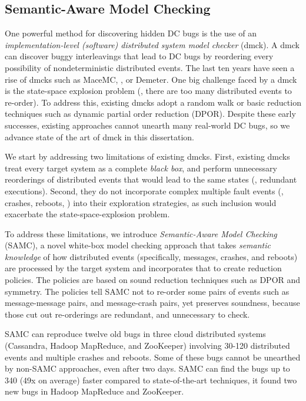 \subsection{Semantic-Aware Model Checking}

One powerful method for discovering hidden DC bugs is the use of an
\textit{implementation-level (software) distributed system model checker} (dmck).  A dmck
can discover buggy interleavings that lead to DC bugs by reordering every
possibility of nondeterministic distributed events. The last ten years have seen
a rise of dmcks such as MaceMC, \modist, or Demeter. One big challenge faced by
a dmck is the state-space explosion problem (\ie, there are too many distributed
events to re-order). To address this, existing dmcks adopt a random walk or
basic reduction techniques such as dynamic partial order reduction (DPOR).
Despite these early successes, existing approaches cannot unearth many
real-world DC bugs, so we advance state of the art of dmck in this dissertation.

We start by addressing two limitations of existing dmcks. First, existing dmcks
treat every target system as a complete \textit{black box}, and perform
unnecessary reorderings of distributed events that would lead to the same states
(\ie, redundant executions). Second, they do not incorporate complex multiple
fault events (\eg, crashes, reboots, \etc) into their exploration strategies, as
such inclusion would exacerbate the state-space-explosion problem.

To address these limitations, we introduce \textit{Semantic-Aware Model
Checking} (SAMC), a novel white-box model checking approach that takes
\textit{semantic knowledge} of how distributed events (specifically, messages,
crashes, and reboots) are processed by the target system and incorporates that
to create reduction policies. The policies are based on sound reduction
techniques such as DPOR and symmetry. The policies tell SAMC not to re-order
some pairs of events such as message-message pairs, and message-crash pairs, yet
preserves soundness, because those cut out re-orderings are redundant, and
unnecessary to check.

SAMC can reproduce twelve old bugs in three cloud distributed systems
(Cassandra, Hadoop MapReduce, and ZooKeeper) involving 30-120 distributed events
and multiple crashes and reboots. Some of these bugs cannot be unearthed by
non-SAMC approaches, even after two days. SAMC can find the bugs up to 340 (49x
on average) faster compared to state-of-the-art techniques, it found two new
bugs in Hadoop MapReduce and ZooKeeper.

